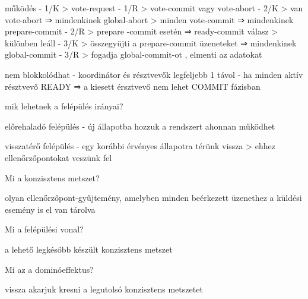 \documentclass[12pt]{article}
\begin{document}
\begin{description}
                                    \item működés
                                        - 1/K
                                        > vote-request
                                        - 1/R
                                        > vote-commit vagy vote-abort
                                        - 2/K
                                        > van vote-abort ⇒ mindenkinek global-abort 
                                        > minden vote-commit ⇒ mindenkinek prepare-commit
                                        - 2/R
                                        > prepare -commit esetén ⇒ ready-commit válasz
                                        > különben leáll 
                                        - 3/K
                                        > összegyüjti a prepare-commit üzeneteket ⇒ mindenkinek global-commit
                                        - 3/R
                                        > fogadja global-commit-ot , elmenti az adatokat
                                    \item nem blokkolódhat
                                        - koordinátor és résztvevők legfeljebb 1 távol
                                        - ha minden aktív résztvevő READY ⇒ a kiesett érsztvevő nem lehet COMMIT fázisban
                                    \item  mik lehetnek a felépülés irányai?
                                    \item előrehaladó felépülés
                                        - új állapotba hozzuk a rendszert ahonnan működhet
                                    \item visszatérő felépülés
                                        - egy korábbi érvényes állapotra térünk vissza
                                        > ehhez ellenőrzőpontokat veszünk fel
                                    \item  Mi a konzisztens metszet?
                                    \item olyan ellenőrzőpont-gyűjtemény, amelyben minden beérkezett üzenethez a küldési esemény is el van tárolva
                                    \item  Mi a felépülési vonal?
                                    \item a lehető legkésőbb készült konzisztens metszet
                                    \item  Mi az a dominóeffektus?
                                    \item vissza akarjuk kresni a legutolsó konzisztens metszetet

\end{description}
\end{document}
